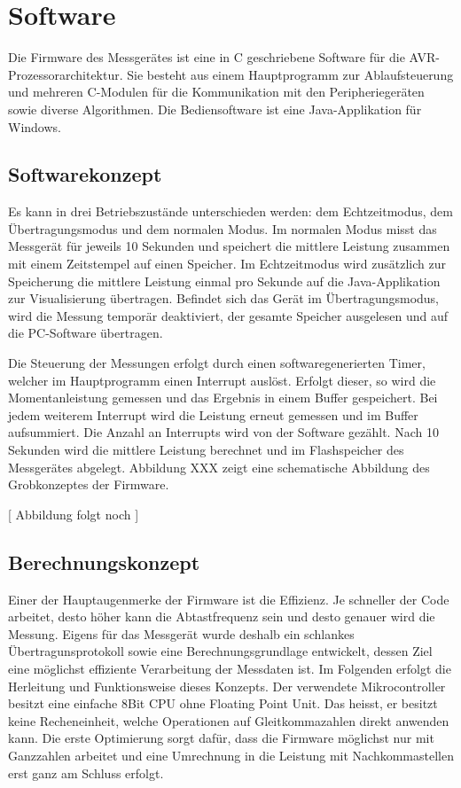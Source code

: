 \section{Software}
Die Firmware des Messgerätes ist eine in C geschriebene Software für die AVR-Prozessorarchitektur. Sie besteht aus einem Hauptprogramm zur Ablaufsteuerung und mehreren C-Modulen für die Kommunikation mit den Peripheriegeräten sowie diverse Algorithmen. Die Bediensoftware ist eine Java-Applikation für Windows.

\subsection{Softwarekonzept}
Es kann in drei Betriebszustände unterschieden werden: dem Echtzeitmodus, dem Übertragungsmodus und dem normalen Modus. Im normalen Modus misst das Messgerät für jeweils 10 Sekunden und speichert die mittlere Leistung zusammen mit einem Zeitstempel auf einen Speicher. Im Echtzeitmodus wird zusätzlich zur Speicherung die mittlere Leistung einmal pro Sekunde auf die Java-Applikation zur Visualisierung übertragen. Befindet sich das Gerät im Übertragungsmodus, wird die Messung temporär deaktiviert, der gesamte Speicher ausgelesen und auf die PC-Software übertragen.

Die Steuerung der Messungen erfolgt durch einen softwaregenerierten Timer, welcher im Hauptprogramm einen Interrupt auslöst. Erfolgt dieser, so wird die Momentanleistung gemessen und das Ergebnis in einem Buffer gespeichert. Bei jedem weiterem Interrupt wird die Leistung erneut gemessen und im Buffer aufsummiert. Die Anzahl an Interrupts wird von der Software gezählt. Nach 10 Sekunden wird die mittlere Leistung berechnet und im Flashspeicher des Messgerätes abgelegt. Abbildung XXX zeigt eine schematische Abbildung des Grobkonzeptes der Firmware.

[ Abbildung folgt noch ] 

\subsection{Berechnungskonzept}
Einer der Hauptaugenmerke der Firmware ist die Effizienz. Je schneller der Code arbeitet, desto höher kann die Abtastfrequenz sein und desto genauer wird die Messung. Eigens für das Messgerät wurde deshalb ein schlankes Übertragunsprotokoll sowie eine Berechnungsgrundlage entwickelt, dessen Ziel eine möglichst effiziente Verarbeitung der Messdaten ist. Im Folgenden erfolgt die Herleitung und Funktionsweise dieses Konzepts.
Der verwendete Mikrocontroller besitzt eine einfache 8Bit CPU ohne Floating Point Unit. Das heisst, er besitzt keine Recheneinheit, welche Operationen auf Gleitkommazahlen direkt anwenden kann. Die erste Optimierung sorgt dafür, dass die Firmware möglichst nur mit Ganzzahlen arbeitet und eine Umrechnung in die Leistung mit Nachkommastellen erst ganz am Schluss erfolgt.


